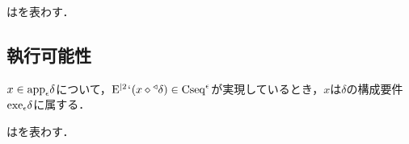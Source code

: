\begin{df}
\label{df:純粋条件}
はを表わす．
\end{df}

\subsection{執行可能性}
\label{ssec:執行可能性}

$x\in\mathrm{app}_{\epsilon}\delta$について，$ \mathrm{E}^{\mid 2}{\mspace{1mu}{`}\mspace{1mu}} (x\diamond{^\triangleleft}\delta)\in\mathrm{Cseq}^\epsilon $が実現しているとき，$x$は$\delta$の構成要件$\exe{\epsilon}\delta$に属する．

\begin{df}
\label{df:構成要件}
\kagi{$
    \exe{\epsilon}\delta
$}はを表わす．
\end{df}

